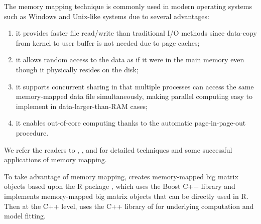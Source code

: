 The memory mapping technique is commonly used in modern operating systems such as Windows and Unix-like systems due to several advantages:
\begin{enumerate}[(1)]
\item it provides faster file read/write than traditional I/O methods since data-copy from kernel to user buffer is not needed due to page caches;
\item it allows random access to the data as if it were in the main memory even though it physically resides on the disk;
\item it supports concurrent sharing in that multiple processes can access the same memory-mapped data file simultaneously, making parallel computing easy to implement in data-larger-than-RAM cases;
\item it enables out-of-core computing thanks to the automatic page-in-page-out procedure.
\end{enumerate}
We refer the readers to \cite{rao2010critical}, \cite{lin2014mmap}, and \cite{bovet2005understanding} for detailed techniques and some successful applications of memory mapping.

To take advantage of memory mapping,  creates memory-mapped big matrix objects based upon the R package  \citep{kane2013scalable}, which uses the Boost C++ library and implements memory-mapped big matrix objects that can be directly used in R. Then at the C++ level,  uses the C++ library of  for underlying computation and model fitting.


